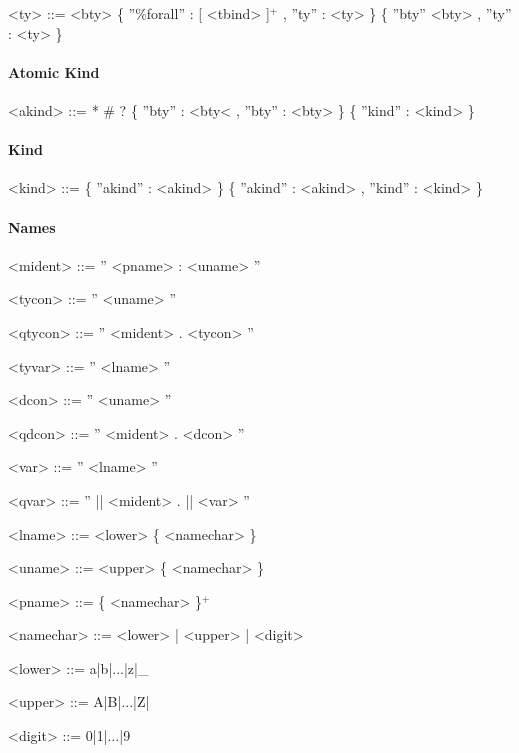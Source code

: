 \begin{scriptsize}
\begin{grammar}

<ty>		  ::= 	 <bty>
		  \alt 	 \{ ''\%forall'' :  [ <tbind> ]$^+$ , ''ty'' : <ty> \}	
		  \alt 	 \{ ''bty'' <bty> , ''ty'' : <ty> \} 


\end{grammar}

\paragraph{Atomic Kind}

\begin{grammar}

<akind>		  ::= 	 *	
		  \alt 	 \#
		  \alt 	 ?	
		  \alt 	 \{ ''bty'' : <bty< , ''bty'' : <bty> \}
		  \alt 	 \{ ''kind'' : <kind> \}	


\end{grammar}

\paragraph{Kind}

\begin{grammar}

<kind>		  ::= 	\{ ''akind'' : <akind> \}					
		  \alt 	\{ ''akind'' : <akind> , ''kind'' : <kind> \}		

\end{grammar}

\paragraph{Names}

\begin{grammar}
<mident>	  ::= 	 '' <pname> : <uname> ''
	
<tycon>		  ::= 	 '' <uname> ''
		
<qtycon>	  ::= 	 '' <mident> . <tycon> ''

<tyvar>		  ::= 	 '' <lname> ''
	
<dcon>		  ::= 	 '' <uname> ''
	
<qdcon>		  ::= 	 '' <mident> . <dcon> ''

<var>		  ::= 	 '' <lname> ''

<qvar>		  ::= 	 '' || <mident> . || <var> ''

<lname>		  ::= 	 <lower> \{ <namechar> \}
 
<uname>		  ::= 	 <upper> \{ <namechar> \}

<pname>		  ::= 	 \{ <namechar> \}$^+$

<namechar>	  ::= 	 <lower> | <upper> | <digit>

<lower>		  ::= 	 a|b|...|z|\_

<upper>		  ::= 	 A|B|...|Z|

<digit>		  ::= 	 0|1|...|9									 


\end{grammar}


\end{scriptsize}
